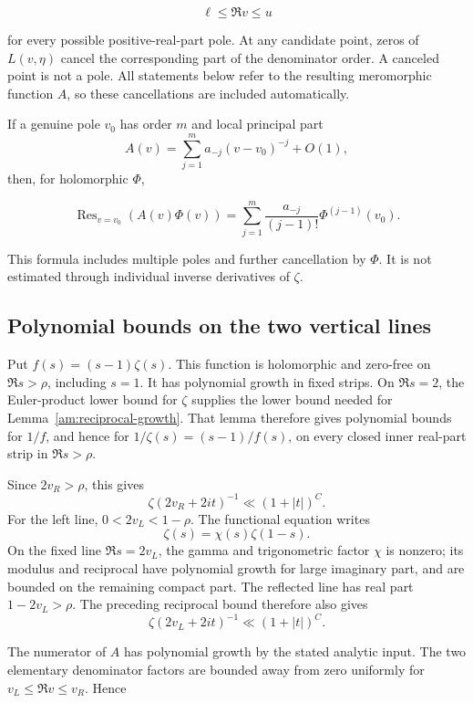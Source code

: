 \documentclass[11pt]{article}
\numberwithin{equation}{section}
\begin{document}
\[
 \ell\leq\Re v\leq u
\]

for every possible positive-real-part pole. At any candidate point,
zeros of \(L(v,\eta)\) cancel the corresponding part of the denominator
order. A canceled point is not a pole. All statements below refer to the
resulting meromorphic function \(A\), so these cancellations are
included automatically.

If a genuine pole \(v_0\) has order \(m\) and local principal part \[
 A(v)=\sum_{j=1}^{m}a_{-j}(v-v_0)^{-j}+O(1),
\] then, for holomorphic \(\Phi\),

\begin{equation}\label{res:A1}
\operatorname{Res}_{v=v_0}(A(v)\Phi(v))
 =\sum_{j=1}^{m}\frac{a_{-j}}{(j-1)!}\Phi^{(j-1)}(v_0).
\end{equation}

This formula includes multiple poles and further cancellation by
\(\Phi\). It is not estimated through individual inverse derivatives of
\(\zeta\).

\subsection{Polynomial bounds on the two vertical
lines}\label{polynomial-bounds-on-the-two-vertical-lines}

Put \(f(s)=(s-1)\zeta(s)\). This function is holomorphic and zero-free
on \(\Re s>\rho\), including \(s=1\). It has polynomial growth in fixed
strips. On \(\Re s=2\), the Euler-product lower bound for \(\zeta\)
supplies the lower bound needed for
Lemma~\ref{am:reciprocal-growth}. That lemma therefore
gives polynomial bounds for \(1/f\), and hence for
\(1/\zeta(s)=(s-1)/f(s)\), on every closed inner real-part strip in
\(\Re s>\rho\).

Since \(2v_R>\rho\), this gives \[
 \zeta(2v_R+2it)^{-1}\ll (1+|t|)^C.
\] For the left line, \(0<2v_L<1-\rho\). The functional equation writes
\[
 \zeta(s)=\chi(s)\zeta(1-s).
\] On the fixed line \(\Re s=2v_L\), the gamma and trigonometric factor
\(\chi\) is nonzero; its modulus and reciprocal have polynomial growth
for large imaginary part, and are bounded on the remaining compact part.
The reflected line has real part \(1-2v_L>\rho\). The preceding
reciprocal bound therefore also gives \[
 \zeta(2v_L+2it)^{-1}\ll (1+|t|)^C.
\]

The numerator of \(A\) has polynomial growth by the stated analytic
input. The two elementary denominator factors are bounded away from zero
uniformly for \(v_L\leq\Re v\leq v_R\). Hence
\end{document}
